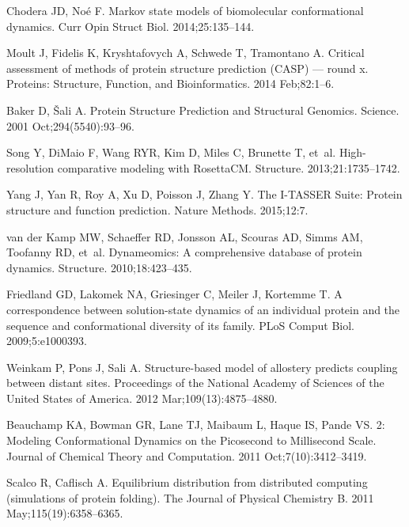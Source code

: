 \documentclass[10pt,letterpaper]{article}
\begin{document}
\begin{thebibliography}{100}
Chodera JD, No\'{e} F.
\newblock Markov state models of biomolecular conformational dynamics.
\newblock Curr Opin Struct Biol. 2014;25:135--144.

Moult J, Fidelis K, Kryshtafovych A, Schwede T, Tramontano A.
\newblock Critical assessment of methods of protein structure prediction
  ({CASP}) — round x.
\newblock Proteins: Structure, Function, and Bioinformatics. 2014 Feb;82:1--6.

Baker D, {\v{S}ali} A.
\newblock Protein {Structure} {Prediction} and {Structural} {Genomics}.
\newblock Science. 2001 Oct;294(5540):93--96.

Song Y, {DiMaio} F, Wang RYR, Kim D, Miles C, Brunette T, et~al.
\newblock High-resolution comparative modeling with {RosettaCM}.
\newblock Structure. 2013;21:1735--1742.

Yang J, Yan R, Roy A, Xu D, Poisson J, Zhang Y.
\newblock The {I-TASSER Suite}: Protein structure and function prediction.
\newblock Nature Methods. 2015;12:7.

{van der Kamp} MW, Schaeffer RD, Jonsson AL, Scouras AD, Simms AM, Toofanny RD,
  et~al.
\newblock Dynameomics: A comprehensive database of protein dynamics.
\newblock Structure. 2010;18:423--435.

Friedland GD, Lakomek NA, Griesinger C, Meiler J, Kortemme T.
\newblock A correspondence between solution-state dynamics of an individual
  protein and the sequence and conformational diversity of its family.
\newblock PLoS Comput Biol. 2009;5:e1000393.

Weinkam P, Pons J, Sali A.
\newblock Structure-based model of allostery predicts coupling between distant
  sites.
\newblock Proceedings of the National Academy of Sciences of the United States
  of America. 2012 Mar;109(13):4875--4880.

Beauchamp KA, Bowman GR, Lane TJ, Maibaum L, Haque IS, Pande VS.
2: {Modeling} {Conformational} {Dynamics} on the
  {Picosecond} to {Millisecond} {Scale}.
\newblock Journal of Chemical Theory and Computation. 2011
  Oct;7(10):3412--3419.

Scalco R, Caflisch A.
\newblock Equilibrium distribution from distributed computing (simulations of
  protein folding).
\newblock The Journal of Physical Chemistry B. 2011 May;115(19):6358--6365.


\end{thebibliography}
\end{document}
